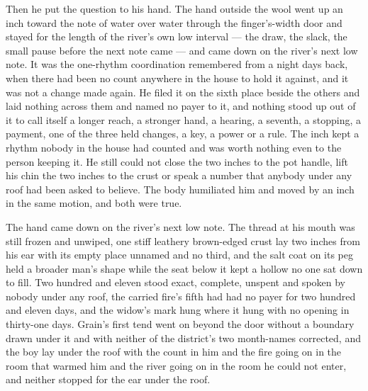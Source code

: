 Then he put the question to his hand. The hand outside the wool went up an inch toward the note of water over water through the finger's-width door and stayed for the length of the river's own low interval --- the draw, the slack, the small pause before the next note came --- and came down on the river's next low note. It was the one-rhythm coordination remembered from a night days back, when there had been no count anywhere in the house to hold it against, and it was not a change made again. He filed it on the sixth place beside the others and laid nothing across them and named no payer to it, and nothing stood up out of it to call itself a longer reach, a stronger hand, a hearing, a seventh, a stopping, a payment, one of the three held changes, a key, a power or a rule. The inch kept a rhythm nobody in the house had counted and was worth nothing even to the person keeping it. He still could not close the two inches to the pot handle, lift his chin the two inches to the crust or speak a number that anybody under any roof had been asked to believe. The body humiliated him and moved by an inch in the same motion, and both were true.

The hand came down on the river's next low note. The thread at his mouth was still frozen and unwiped, one stiff leathery brown-edged crust lay two inches from his ear with its empty place unnamed and no third, and the salt coat on its peg held a broader man's shape while the seat below it kept a hollow no one sat down to fill. Two hundred and eleven stood exact, complete, unspent and spoken by nobody under any roof, the carried fire's fifth had had no payer for two hundred and eleven days, and the widow's mark hung where it hung with no opening in thirty-one days. Grain's first tend went on beyond the door without a boundary drawn under it and with neither of the district's two month-names corrected, and the boy lay under the roof with the count in him and the fire going on in the room that warmed him and the river going on in the room he could not enter, and neither stopped for the ear under the roof.
